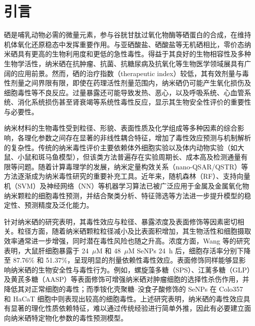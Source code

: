 \section{引言}

硒是哺乳动物必需的微量元素，参与谷胱甘肽过氧化物酶等硒蛋白的合成，在维持机体氧化还原稳态中发挥重要作用。与亚硒酸盐、硒酸盐等无机硒相比，零价态纳米硒具有更高的生物利用度和更低的急性毒性。得益于其良好的生物相容性及多种生物学活性，纳米硒在抗肿瘤、抗菌、抗糖尿病及抗氧化等生物医学领域展具有广阔的应用前景\cite{hosnedlova2018nanoselenium,bisht2022senps,sowmya2024nanoselenium,karthik2024senps}。然而，硒的治疗指数（therapeutic index）较低，其有效剂量与毒性剂量之间界限有限，即使在药理活性剂量范围内，纳米硒仍可能产生氧化损伤及细胞毒性等不良反应\cite{wang2020prooxidation}。过量暴露还可能导致发热、恶心，以及呼吸系统、心血管系统、消化系统损伤甚至肾衰竭等系统性毒性反应\cite{hosnedlova2018nanoselenium}，显示其生物安全性评价的重要性与必要性。
 
纳米材料的生物毒性受到粒径、形貌、表面性质及化学组成等多种因素的综合影响，各理化参数之间存在显著的非线性耦合特征，增加了毒性效应预测与机制解析的复杂性\cite{ji2025rosml}。传统的纳米毒性评价主要依赖体外细胞实验以及体内动物实验（如大鼠、小鼠和斑马鱼模型），但该类方法普遍存在实验周期长、成本高及检测通量有限等问题\cite{ahmadi2024toxicity}。随着计算毒理学的发展，纳米定量构效关系（nano-QSAR/QSTR）等方法逐渐成为纳米毒性研究的重要补充工具\cite{roy2023tio2}。近年来，随机森林（RF）、支持向量机（SVM）及神经网络（NN）等机器学习算法已被广泛应用于金属及金属氧化物纳米颗粒的细胞毒性预测\cite{zhang2023qsar}，并结合聚类分析、特征筛选等方法进一步提升模型的稳定性、预测精度及泛化能力\cite{sang2022mlcytotoxicity}。
 
针对纳米硒的研究表明，其毒性效应与粒径、暴露浓度及表面修饰等因素密切相关。粒径方面，随着纳米硒颗粒粒径减小及比表面积增加，其生物活性和细胞摄取效率通常进一步增强，同时潜在毒性风险也随之升高\cite{zhang2023senpsbio}。浓度方面，Wang 等\cite{wang2020prooxidation}的研究表明，大鼠肝细胞暴露于 24~$\mu$M 和 48~$\mu$M SeNPs 24~h 后，细胞存活率分别下降至 87.76\% 和 51.37\%，呈现明显的剂量依赖性毒性效应。表面修饰同样能够显影响纳米硒的生物安全性与毒性行为。例如，螺旋藻多糖（SPS）、江蓠多糖（GLP）及黄芪多糖（AASP）等表面修饰可增强纳米硒对肿瘤细胞的选择性杀伤作用，并降低其对正常细胞的毒性\cite{zhang2023senpsbio,ji2023astragalus}；而季铵化壳聚糖--没食子酸修饰的 SeNPs 在 Colo357 和 HaCaT 细胞中则表现出较高的细胞毒性\cite{lunkov2023chitosan}。上述研究表明，纳米硒的毒性效应具有显著的理化性质依赖特征，难以通过传统经验进行简单外推，因此有必要建立面向纳米硒特定物化参数的毒性预测模型。
 

